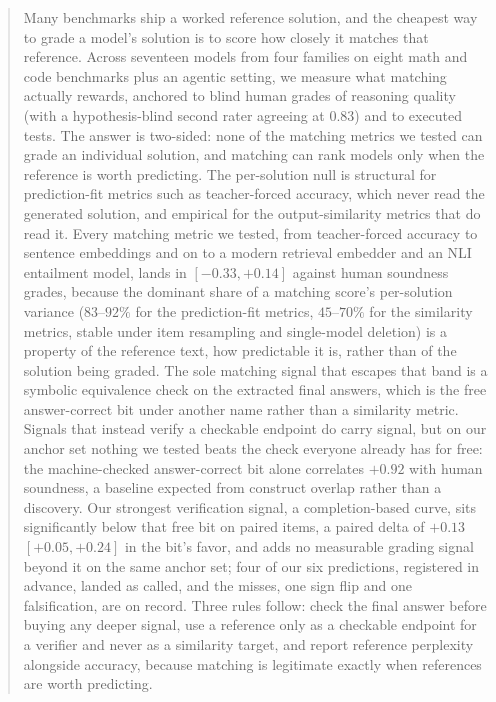 \begin{abstract}
Many benchmarks ship a worked reference solution, and the cheapest way to grade a model's solution is to score how closely it matches that reference.
Across seventeen models from four families on eight math and code benchmarks plus an agentic setting, we measure what matching actually rewards, anchored to blind human grades of reasoning quality (with a hypothesis-blind second rater agreeing at $0.83$) and to executed tests.
The answer is two-sided: none of the matching metrics we tested can grade an individual solution, and matching can rank models only when the reference is worth predicting.
The per-solution null is structural for prediction-fit metrics such as teacher-forced accuracy, which never read the generated solution, and empirical for the output-similarity metrics that do read it.
Every matching metric we tested, from teacher-forced accuracy to sentence embeddings and on to a modern retrieval embedder and an NLI entailment model, lands in $[-0.33, +0.14]$ against human soundness grades, because the dominant share of a matching score's per-solution variance ($83$--$92\%$ for the prediction-fit metrics, $45$--$70\%$ for the similarity metrics, stable under item resampling and single-model deletion) is a property of the reference text, how predictable it is, rather than of the solution being graded.
The sole matching signal that escapes that band is a symbolic equivalence check on the extracted final answers, which is the free answer-correct bit under another name rather than a similarity metric.
Signals that instead verify a checkable endpoint do carry signal, but on our anchor set nothing we tested beats the check everyone already has for free: the machine-checked answer-correct bit alone correlates $+0.92$ with human soundness, a baseline expected from construct overlap rather than a discovery.
Our strongest verification signal, a completion-based curve, sits significantly below that free bit on paired items, a paired delta of $+0.13$ $[+0.05, +0.24]$ in the bit's favor, and adds no measurable grading signal beyond it on the same anchor set; four of our six predictions, registered in advance, landed as called, and the misses, one sign flip and one falsification, are on record.
Three rules follow: check the final answer before buying any deeper signal, use a reference only as a checkable endpoint for a verifier and never as a similarity target, and report reference perplexity alongside accuracy, because matching is legitimate exactly when references are worth predicting.
\end{abstract}
